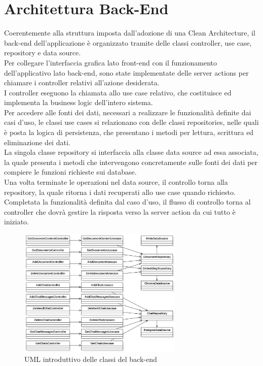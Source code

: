 \section{Architettura Back-End} \label{sec:archback}

Coerentemente alla struttura imposta dall'adozione di una Clean Architecture, il back-end dell'applicazione è organizzato tramite delle classi controller, use case, repository e data source.\\
Per collegare l'interfaccia grafica lato front-end con il funzionamento dell'applicativo lato back-end, sono state implementate delle server actions per chiamare i controller relativi all'azione desiderata.\\
I controller eseguono la chiamata allo use case relativo, che costituisce ed implementa la business logic dell'intero sistema.\\
Per accedere alle fonti dei dati, necessari a realizzare le funzionalità definite dai casi d'uso, le classi use cases si relazionano con delle classi repositories, nelle quali è posta la logica di persistenza, che presentano i metodi per lettura, scrittura ed eliminazione dei dati.\\
La singola classe repository si interfaccia alla classe data source ad essa associata, la quale presenta i metodi che intervengono concretamente sulle fonti dei dati per compiere le funzioni richieste sui database.\\
Una volta terminate le operazioni nel data source, il controllo torna alla repository, la quale ritorna i dati recuperati allo use case quando richiesto. Completata la funzionalità definita dal caso d'uso, il flusso di controllo torna al controller che dovrà gestire la risposta verso la server action da cui tutto è iniziato.

\begin{figure}[h!]
    \centering  
    \includegraphics[width=0.7\textwidth]{backendview.png}
    \caption{UML introduttivo delle classi del back-end}
\end{figure}


